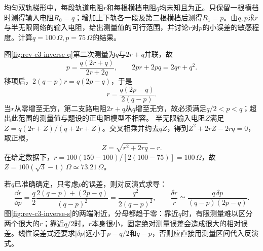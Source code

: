 \begin{exercise}[由有限梯形的测量反求参数]\label{ex:rev-c3-inverse}
均匀双轨梯形中，每段轨道电阻$r$和每根横档电阻$q$均未知且为正。只保留一根横档时测得输入电阻$R_0=q$；增加上下轨各一段及第二根横档后测得$R_1=p$。由$q,p$求$r$与半无限网络的输入电阻，给出测量值的可行范围，并讨论$r$对$p$的小误差的敏感程度。计算$q=100\,\Omega,p=75\,\Omega$的结果。
\end{exercise}
\begin{solution}
图\ref{fig:rev-c3-inverse-q}第二次测量为$q$与$2r+q$并联，故
\[
 p=\frac{q(2r+q)}{2r+2q},\qquad
 2pr+2pq=2qr+q^2.
\]
移项后，$2(q-p)r=q(2p-q)$，于是
\[
 \boxed{r=\frac{q(2p-q)}{2(q-p)}}.
\]
当$r$从零增至无穷，第二支路电阻$2r+q$从$q$增至无穷，故必须满足$q/2<p<q$；超出此范围的测量值与题设的正电阻模型不相容。
半无限输入电阻$Z$满足$Z=q(2r+Z)/(q+2r+Z)$。交叉相乘并约去$qZ$，得到$Z^2+2rZ-2rq=0$，取正根，
\[
 \boxed{Z=\sqrt{r^2+2rq}-r}.
\]
在给定数据下，$r=100(150-100)/[2(100-75)]=100\,\Omega$，故$Z=100(\sqrt3-1)\,\Omega\simeq73.21\,\Omega$。

若$q$已准确确定，只考虑$p$的误差，则对反演式求导：
\[
 \frac{\dd r}{\dd p}
 =\frac q2\frac{2(q-p)+(2p-q)}{(q-p)^2}
 =\frac{q^2}{2(q-p)^2},\qquad
 \frac{\delta r}{r}\simeq
 \frac{q\,\delta p}{(q-p)(2p-q)}.
\]
图\ref{fig:rev-c3-inverse-s}的两端附近，分母都趋于零：靠近$q$时，有限测量难以区分两个很大的$r$；靠近$q/2$时，$r$本身很小，固定绝对测量误差会造成很大的相对误差。线性误差式还要求$|\delta p|$远小于$p-q/2$和$q-p$，否则应直接用测量区间代入反演式。
\end{solution}

